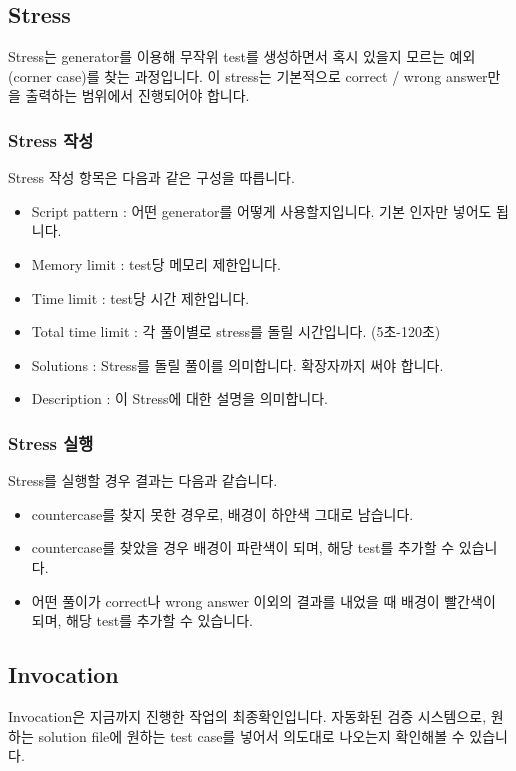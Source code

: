 \documentclass{article}
\begin{document}
    \subsection{Stress}
    Stress는 generator를 이용해 무작위 test를 생성하면서 혹시 있을지 모르는 예외(corner case)를 찾는 과정입니다. 이 stress는 기본적으로 correct / wrong answer만을 출력하는 범위에서 진행되어야 합니다.
    \subsubsection{Stress 작성}
    Stress 작성 항목은 다음과 같은 구성을 따릅니다.
    \begin{itemize}
        \item Script pattern : 어떤 generator를 어떻게 사용할지입니다. 기본 인자만 넣어도 됩니다.
        \item Memory limit : test당 메모리 제한입니다.
        \item Time limit : test당 시간 제한입니다.
        \item Total time limit : 각 풀이별로 stress를 돌릴 시간입니다. (5초-120초)
        \item Solutions : Stress를 돌릴 풀이를 의미합니다.
        확장자까지 써야 합니다.
        \item Description : 이 Stress에 대한 설명을 의미합니다.
    \end{itemize}
    \subsubsection{Stress 실행}
    Stress를 실행할 경우 결과는 다음과 같습니다.
    \begin{itemize}
        \item countercase를 찾지 못한 경우로, 배경이 하얀색 그대로 남습니다.
        \item countercase를 찾았을 경우 배경이 파란색이 되며, 해당 test를 추가할 수 있습니다.
        \item 어떤 풀이가 correct나 wrong answer 이외의 결과를 내었을 때 배경이 빨간색이 되며, 해당 test를 추가할 수 있습니다.
    \end{itemize}
    \subsection{Invocation}
    Invocation은 지금까지 진행한 작업의 최종확인입니다. 자동화된 검증 시스템으로, 원하는 solution file에 원하는 test case를 넣어서 의도대로 나오는지 확인해볼 수 있습니다.
\end{document}
